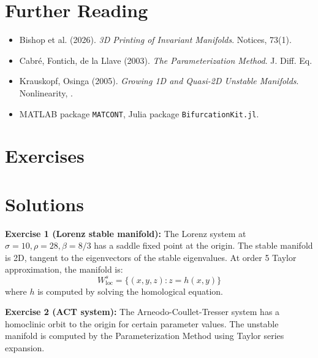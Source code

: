 \section{Further Reading}
\label{sec:3dp:refs}

\begin{itemize}
    \item Bishop et al. (2026). \textit{3D Printing of Invariant Manifolds}. Notices, 73(1).
    \item Cabré, Fontich, de la Llave (2003). \textit{The Parameterization Method}. J. Diff. Eq.
    \item Krauskopf, Osinga (2005). \textit{Growing 1D and Quasi-2D Unstable Manifolds}. Nonlinearity, \cite{krauskopf2005growing}.
    \item MATLAB package \texttt{MATCONT}, Julia package \texttt{BifurcationKit.jl}.
\end{itemize}

\section{Exercises}
\section{Solutions}
\label{sec:3dp:solutions}

\begin{solution}
\textbf{Exercise 1 (Lorenz stable manifold):} The Lorenz system at $\sigma = 10, \rho = 28, \beta = 8/3$ has a saddle fixed point at the origin. The stable manifold is 2D, tangent to the eigenvectors of the stable eigenvalues. At order 5 Taylor approximation, the manifold is:
$$W^s_{\text{loc}} = \{(x,y,z) : z = h(x,y)\}$$
where $h$ is computed by solving the homological equation.
\end{solution}

\begin{solution}
\textbf{Exercise 2 (ACT system):} The Arneodo-Coullet-Tresser system has a homoclinic orbit to the origin for certain parameter values. The unstable manifold is computed by the Parameterization Method using Taylor series expansion.
\end{solution}

